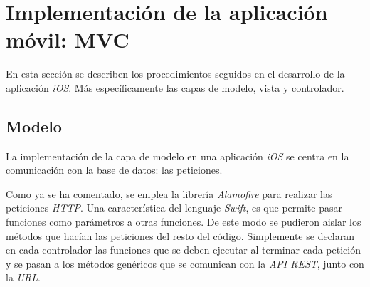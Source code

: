 \section{Implementación de la aplicación móvil: MVC}
En esta sección se describen los procedimientos seguidos en el  desarrollo de la aplicación \textit{iOS}.
Más específicamente las capas de modelo, vista y  controlador.

\subsection{Modelo}
La implementación de la capa de modelo en una aplicación \textit{iOS} se centra en la comunicación con la base de datos: las peticiones.

Como ya se ha comentado, se emplea la librería \textit{Alamofire} para realizar las peticiones \textit{HTTP}. Una característica del lenguaje \textit{Swift}, es que permite pasar funciones como parámetros a otras funciones. De este modo se pudieron aislar los métodos que hacían las peticiones del resto del código.
Simplemente se declaran en cada controlador las funciones que se deben ejecutar al terminar cada petición y se pasan a los métodos genéricos que se comunican con la \textit{API REST}, junto con la \textit{URL}.

